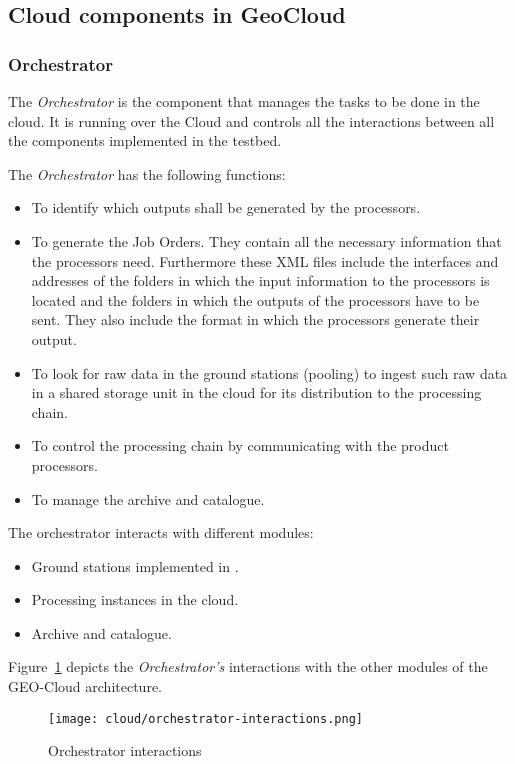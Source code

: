 \subsection{Cloud components in GeoCloud}

\subsubsection{Orchestrator}
\label{sub:orch}
The \emph{Orchestrator} is the
component that manages the tasks to be done in the cloud. It is running over the
\bonfire Cloud and controls all the interactions between all the components
implemented in the \bonfire testbed.

The \emph{Orchestrator} has the following functions:

\begin{itemize}
\item To identify which outputs shall be generated by the processors.
\item To generate the Job Orders. They contain all the necessary information
  that the processors need. Furthermore these \ac{XML} files include the interfaces and addresses of the folders in which the input information to the processors is located and the folders in which the outputs of the processors have to be sent. They also include the format in which the processors generate their output.
\item To look for raw data in the ground stations (pooling) to ingest such raw data in a shared storage unit in the cloud for its distribution to the processing chain.
\item To control the processing chain by communicating with the product processors.
\item To manage the archive and catalogue.
\end{itemize}

The orchestrator interacts with different modules:
\begin{itemize}

\item Ground stations implemented in \vw.
\item Processing instances in the cloud.
\item Archive and catalogue.
\end{itemize}

Figure~\ref{fig:orchestrator-interactions} depicts the \emph{Orchestrator’s} interactions with the other modules of the GEO-Cloud architecture.


\begin{figure}[!h]
\begin{center}
\texttt{[image: cloud/orchestrator-interactions.png]}
\caption{Orchestrator interactions}
\label{fig:orchestrator-interactions}
\end{center}
\end{figure}



